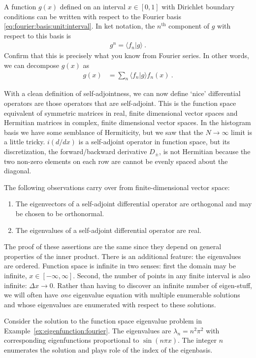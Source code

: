 \begin{exercise}\label{exe:eigenfunction:fourier}
A function $g(x)$ defined on an interval $x\in [0,1]$ with Dirichlet boundary conditions can be written with respect to the Fourier basis \eqref{eq:fourier:basis:unit:interval}. In ket notation, the $n^\text{th}$ component of $g$ with respect to this basis is
\begin{align}
  g^n = \langle f_n| g\rangle \ .
\end{align}
Confirm that this is precisely what you know from Fourier series. In other words, we can decompose $g(x)$ as
\begin{align}
  g(x) &= \sum_n \langle f_n| g\rangle f_n(x)  \ .
\end{align}
\end{exercise}







With a clean definition of self-adjointness, we can now define `nice' differential operators are those operators that are self-adjoint. This is the function space equivalent of symmetric matrices in real, finite dimensional vector spaces and Hermitian matrices in complex, finite dimensional vector spaces. In the histogram basis we have some semblance of Hermiticity, but we saw that the $N\to\infty$ limit is a little tricky. $i(d/dx)$ is a self-adjoint operator in function space, but its discretization, the forward/backward derivative $D_\pm$, is not Hermitian because the two non-zero elements on each row are cannot be evenly spaced about the diagonal. 

The following observations carry over from finite-dimensional vector space:
\begin{enumerate}
    \item The eigenvectors of a self-adjoint differential operator are orthogonal and may be chosen to be orthonormal.
    \item The eigenvalues of a self-adjoint differential operator are real.
\end{enumerate}
The proof of these assertions are the same since they depend on general properties of the inner product. There is an additional feature: the eigenvalues are ordered. Function space is infinite in two senses: first the domain may be infinite, $x\in [-\infty, \infty]$. Second, the number of points in any finite interval is also infinite: $\Delta x \to 0$. Rather than having to discover an infinite number of eigen-stuff, we will often have \emph{one} eigenvalue equation with multiple enumerable solutions and whose eigenvalues are enumerated with respect to these solutions. 
\begin{example}
Consider the solution to the function space eigenvalue problem in Example~\eqref{ex:eigenfunction:fourier}. The eigenvalues are $\lambda_n=n^2\pi^2$ with corresponding eigenfunctions proportional to $\sin(n\pi x)$. The integer $n$ enumerates the solution and plays role of the index of the eigenbasis.
\end{example}

